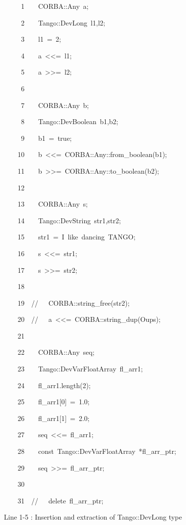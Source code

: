 
\begin{lyxcode}
~~~~~1~~~~CORBA::Any~a;

~~~~~2~~~~Tango::DevLong~l1,l2;

~~~~~3~~~~l1~=~2;

~~~~~4~~~~a~<\textcompwordmark{}<=~l1;

~~~~~5~~~~a~>\textcompwordmark{}>=~l2;

~~~~~6~~

~~~~~7~~~~CORBA::Any~b;

~~~~~8~~~~Tango::DevBoolean~b1,b2;

~~~~~9~~~~b1~=~true;

~~~~10~~~~b~<\textcompwordmark{}<=~CORBA::Any::from\_boolean(b1);

~~~~11~~~~b~>\textcompwordmark{}>=~CORBA::Any::to\_boolean(b2);

~~~~12~~

~~~~13~~~~CORBA::Any~s;

~~~~14~~~~Tango::DevString~str1,str2;

~~~~15~~~~str1~=~\textquotedbl{}I~like~dancing~TANGO\textquotedbl{};

~~~~16~~~~s~<\textcompwordmark{}<=~str1;

~~~~17~~~~s~>\textcompwordmark{}>=~str2;

~~~~18~~

~~~~19~~//~~~CORBA::string\_free(str2);

~~~~20~~//~~~a~<\textcompwordmark{}<=~CORBA::string\_dup(\textquotedbl{}Oups\textquotedbl{});

~~~~21~~

~~~~22~~~~CORBA::Any~seq;

~~~~23~~~~Tango::DevVarFloatArray~fl\_arr1;

~~~~24~~~~fl\_arr1.length(2);

~~~~25~~~~fl\_arr1{[}0{]}~=~1.0;

~~~~26~~~~fl\_arr1{[}1{]}~=~2.0;

~~~~27~~~~seq~<\textcompwordmark{}<=~fl\_arr1;

~~~~28~~~~const~Tango::DevVarFloatArray~{*}fl\_arr\_ptr;

~~~~29~~~~seq~>\textcompwordmark{}>=~fl\_arr\_ptr;

~~~~30~~

~~~~31~~//~~~delete~fl\_arr\_ptr;
\end{lyxcode}


Line 1-5 : Insertion and extraction of Tango::DevLong type

